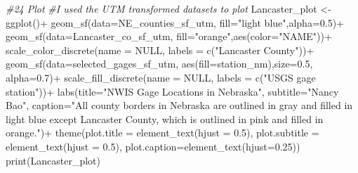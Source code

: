 \documentclass[
]{article}
\newenvironment{Shaded}{\begin{snugshade}}{\end{snugshade}}
\newcommand{\AttributeTok}[1]{\textcolor[rgb]{0.77,0.63,0.00}{#1}}
\newcommand{\CommentTok}[1]{\textcolor[rgb]{0.56,0.35,0.01}{\textit{#1}}}
\newcommand{\ConstantTok}[1]{\textcolor[rgb]{0.00,0.00,0.00}{#1}}
\newcommand{\FloatTok}[1]{\textcolor[rgb]{0.00,0.00,0.81}{#1}}
\newcommand{\FunctionTok}[1]{\textcolor[rgb]{0.00,0.00,0.00}{#1}}
\newcommand{\NormalTok}[1]{#1}
\newcommand{\OtherTok}[1]{\textcolor[rgb]{0.56,0.35,0.01}{#1}}
\newcommand{\SpecialCharTok}[1]{\textcolor[rgb]{0.00,0.00,0.00}{#1}}
\newcommand{\StringTok}[1]{\textcolor[rgb]{0.31,0.60,0.02}{#1}}
\begin{document}
\begin{Shaded}
\begin{Highlighting}[]
\CommentTok{\#24 Plot}
\CommentTok{\#I used the UTM transformed datasets to plot}
\NormalTok{Lancaster\_plot }\OtherTok{\textless{}{-}} \FunctionTok{ggplot}\NormalTok{()}\SpecialCharTok{+}
                  \FunctionTok{geom\_sf}\NormalTok{(}\AttributeTok{data=}\NormalTok{NE\_counties\_sf\_utm,}
                          \AttributeTok{fill=}\StringTok{"light blue"}\NormalTok{,}\AttributeTok{alpha=}\FloatTok{0.5}\NormalTok{)}\SpecialCharTok{+}
                  \FunctionTok{geom\_sf}\NormalTok{(}\AttributeTok{data=}\NormalTok{Lancaster\_co\_sf\_utm,}
                          \AttributeTok{fill=}\StringTok{"orange"}\NormalTok{,}\FunctionTok{aes}\NormalTok{(}\AttributeTok{color=}\StringTok{"NAME"}\NormalTok{))}\SpecialCharTok{+}
                  \FunctionTok{scale\_color\_discrete}\NormalTok{(}\AttributeTok{name =} \ConstantTok{NULL}\NormalTok{, }
                                       \AttributeTok{labels =} \FunctionTok{c}\NormalTok{(}\StringTok{"Lancaster County"}\NormalTok{))}\SpecialCharTok{+}
                  \FunctionTok{geom\_sf}\NormalTok{(}\AttributeTok{data=}\NormalTok{selected\_gages\_sf\_utm,}
                          \FunctionTok{aes}\NormalTok{(}\AttributeTok{fill=}\StringTok{\textquotesingle{}station\_nm\textquotesingle{}}\NormalTok{),}\AttributeTok{size=}\FloatTok{0.5}\NormalTok{, }\AttributeTok{alpha=}\FloatTok{0.7}\NormalTok{)}\SpecialCharTok{+}
                  \FunctionTok{scale\_fill\_discrete}\NormalTok{(}\AttributeTok{name =} \ConstantTok{NULL}\NormalTok{, }\AttributeTok{labels =} \FunctionTok{c}\NormalTok{(}\StringTok{"USGS gage station"}\NormalTok{))}\SpecialCharTok{+}
                 \FunctionTok{labs}\NormalTok{(}\AttributeTok{title=}\StringTok{"NWIS Gage Locations in Nebraska"}\NormalTok{,}
                                   \AttributeTok{subtitle=}\StringTok{"Nancy Bao"}\NormalTok{,}
                      \AttributeTok{caption=}\StringTok{"All county borders in Nebraska are outlined in gray and filled in light blue except Lancaster County, which is outlined in pink and filled in orange."}\NormalTok{)}\SpecialCharTok{+}
                              \FunctionTok{theme}\NormalTok{(}\AttributeTok{plot.title =} \FunctionTok{element\_text}\NormalTok{(}\AttributeTok{hjust =} \FloatTok{0.5}\NormalTok{),}
                              \AttributeTok{plot.subtitle =} \FunctionTok{element\_text}\NormalTok{(}\AttributeTok{hjust =} \FloatTok{0.5}\NormalTok{),}
                              \AttributeTok{plot.caption=}\FunctionTok{element\_text}\NormalTok{(}\AttributeTok{hjust=}\FloatTok{0.25}\NormalTok{))}
\FunctionTok{print}\NormalTok{(Lancaster\_plot)}
\end{Highlighting}
\end{Shaded}
\end{document}
